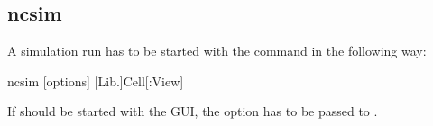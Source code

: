\clearpage
\subsection{ncsim}

A simulation run has to be started with the  command in the following
way:
\begin{lstbashplain}
 ncsim [options] [Lib.]Cell[:View]
\end{lstbashplain}

If  should be started with the  GUI, the option
 has to be passed to .

